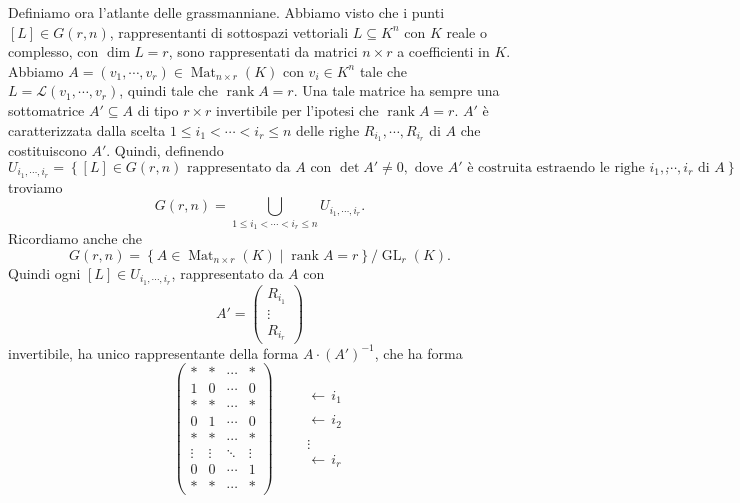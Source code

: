 \documentclass[a4paper]{article}
\begin{document}
Definiamo ora l'atlante delle grassmanniane.
Abbiamo visto che i punti \([L] \in G(r, n)\), rappresentanti
di sottospazi vettoriali \(L \subseteq K^n\)
con \(K\) reale o complesso, con \(\dim L = r\),
sono rappresentati da matrici \(n \times r\) a coefficienti in \(K\).
Abbiamo \(A = (v_1, \cdots, v_r) \in \operatorname{Mat}_{n \times r}(K)\)
con \(v_i \in K^n\) tale che \(L = \mathcal L(v_1, \cdots, v_r)\),
quindi tale che \(\operatorname{rank} A = r\).
Una tale matrice ha sempre una sottomatrice \(A' \subseteq A\)
di tipo \(r \times r\) invertibile per l'ipotesi che \(\operatorname{rank} A = r\).
\(A'\) è caratterizzata dalla scelta \(1 \leq i_1 < \cdots < i_r \leq n\)
delle righe \(R_{i_1}, \cdots, R_{i_r}\) di \(A\)
che costituiscono \(A'\).
Quindi, definendo
\[
    U_{i_1, \cdots, i_r} = \left\{
        [L] \in G(r,n) \text{ rappresentato da } A \text{ con } \det A' \neq 0,
        \text{ dove } A' \text{ è costruita estraendo le righe } i_1, \cdots, i_r \text{ di } A
    \right\},
\]
troviamo
\[
    G(r, n) = \bigcup_{1 \leq i_1 < \cdots < i_r \leq n}
    U_{i_1, \cdots, i_r}.
\]
Ricordiamo anche che
\[
    G(r,n) =
    \left\{
        A \in \operatorname{Mat}_{n \times r}(K) \mid \operatorname{rank} A = r
    \right\} \Big/ \operatorname{GL}_r(K).
\]
Quindi ogni \([L] \in U_{i_1, \cdots, i_r}\),
rappresentato da \(A\) con
\[
    A' = \begin{pmatrix}
        R_{i_1} \\ \vdots \\ R_{i_r}
    \end{pmatrix}
\]
invertibile, ha unico rappresentante della forma \(A \cdot (A')^{-1}\), che ha forma
\[
    \begin{pmatrix}
        \ast & \ast & \cdots & \ast \\
        1 & 0 & \cdots & 0 \\
        \ast & \ast & \cdots & \ast \\
        0 & 1 & \cdots & 0 \\
        \ast & \ast & \cdots & \ast \\
        \vdots & \vdots & \ddots & \vdots \\
        0 & 0 & \cdots & 1 \\
        \ast & \ast & \cdots & \ast
    \end{pmatrix}
    \qquad
    \begin{array}{l}
        \\[-1.2em]
        \leftarrow\, i_1 \\
        \\[-0.2em]
        \leftarrow\, i_2 \\
        \\
        \vdots \\
        \leftarrow\, i_r \\
    \end{array}
\]
\end{document}
